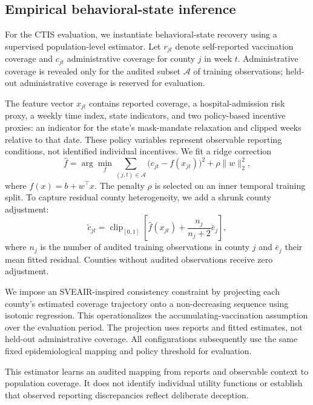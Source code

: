 \documentclass[sigconf,review]{acmart}
\begin{document}
\subsection{Empirical behavioral-state inference}
\label{sec:empirical-inference}

For the CTIS evaluation, we instantiate behavioral-state recovery
using a supervised population-level estimator. Let $r_{jt}$ denote
self-reported vaccination coverage and $c_{jt}$ administrative
coverage for county $j$ in week $t$. Administrative coverage is
revealed only for the audited subset $\mathcal{A}$ of training
observations; held-out administrative coverage is reserved for
evaluation.

The feature vector $x_{jt}$ contains reported coverage, a
hospital-admission risk proxy, a weekly time index, state indicators,
and two policy-based incentive proxies: an indicator for the
state's mask-mandate relaxation and clipped weeks relative to that
date. These policy variables represent observable reporting
conditions, not identified individual incentives.
We fit a ridge correction
\[
\hat f
=\arg\min_f
\sum_{(j,t)\in\mathcal{A}}
\bigl(c_{jt}-f(x_{jt})\bigr)^2
+\rho\|w\|_2^2,
\]
where $f(x)=b+w^\top x$. The penalty $\rho$ is selected on an
inner temporal training split. To capture residual county
heterogeneity, we add a shrunk county adjustment:
\[
\tilde c_{jt}
=\operatorname{clip}_{[0,1]}
\left[
\hat f(x_{jt})
+\frac{n_j}{n_j+2}\bar e_j
\right],
\]
where $n_j$ is the number of audited training observations in county $j$ and $\bar e_j$ their mean fitted residual. Counties without audited observations receive zero adjustment.

We impose an SVEAIR-inspired consistency constraint by projecting each county's estimated coverage trajectory onto a non-decreasing sequence using isotonic regression. This operationalizes the accumulating-vaccination assumption over the evaluation period. The projection uses reports and fitted estimates, not held-out administrative coverage. All configurations subsequently use the same fixed epidemiological mapping and policy threshold for evaluation.

This estimator learns an audited mapping from reports and observable context to population coverage. It does not identify individual utility functions or establish that observed reporting discrepancies reflect deliberate deception.
\end{document}
